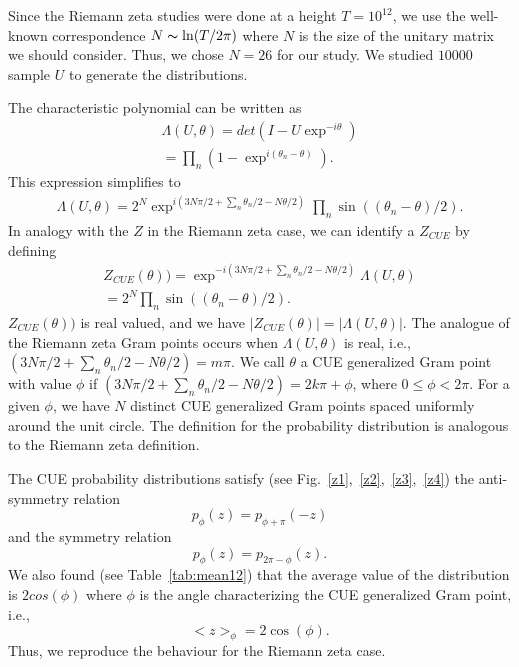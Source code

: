 \documentclass[twoside]{article}
\begin{document}
Since the Riemann zeta studies were done at a
height $T = 10^{12}$, we use the well-known correspondence $N \thicksim \ln(T/2\pi)$ where $N$ 
is the size of the unitary matrix we should consider. Thus, we chose $N = 26$ for our
study.  We studied $10000$ sample $U$ to generate the distributions.

The characteristic polynomial can be written as
\begin{align}
\Lambda(U, \theta) = det(I-U\exp^{-i\theta})\\
                   = \prod_{n}(1-\exp^{i(\theta_{n} - \theta)}).
\label{eq:cueDet}
\end{align}
This expression simplifies to
\begin{align}
\Lambda(U, \theta)  = 2^N\exp^{i(3N\pi/2 + \sum_{n}\theta_{n}/2 - N\theta/2)}\prod_{n}\sin((\theta_{n} - \theta)/2).
\label{eq:cueExpanded}
\end{align}
In analogy with the $Z$ in the Riemann zeta case, we can identify a $Z_{CUE}$ by defining
\begin{align}
Z_{CUE}(\theta))    = \exp^{-i(3N\pi/2 + \sum_{n}\theta_{n}/2 - N\theta/2)}\Lambda(U, \theta)\\
                    = 2^N\prod_{n}\sin((\theta_{n} - \theta)/2).
\label{eq:cueZ}
\end{align}
$Z_{CUE}(\theta))$ is real valued,
and we have $|Z_{CUE}(\theta)| = |\Lambda(U, \theta)|$. The analogue of the Riemann zeta 
Gram points occurs when $\Lambda(U, \theta)$ is real, i.e., 
$(3N\pi/2 + \sum_{n}\theta_{n}/2 - N\theta/2) = m\pi$.
We call $\theta$  a CUE generalized Gram point with value $\phi$  if
$(3N\pi/2 + \sum_{n}\theta_{n}/2 - N\theta/2) = 2k\pi + \phi$, where $0 \le \phi < 2\pi$.
For a given $\phi$, we have $N$ distinct CUE generalized Gram points spaced uniformly
around the unit circle.
The definition for the probability distribution is analogous to the Riemann zeta definition.

The CUE probability distributions satisfy (see Fig.~\ref{z1},~\ref{z2},~\ref{z3},~\ref{z4}) 
the anti-symmetry relation 
\begin{equation}
p_{\phi}(z) = p_{\phi+\pi}(-z)
\label{eq:antisym}
\end{equation}
and the symmetry relation 
\begin{equation}
p_{\phi}(z) = p_{2\pi-\phi}(z).
\label{eq:sym}
\end{equation}
We also found  (see Table~\ref{tab:mean12}) that the average value of the 
distribution is $2cos(\phi)$ where $\phi$
is the angle characterizing the CUE generalized Gram point, i.e., 
\begin{equation}
<z>_{\phi} = 2\cos(\phi).
\label{eq:cosphi}
\end{equation}
Thus, we reproduce the behaviour 
for the Riemann zeta case.
\end{document}
